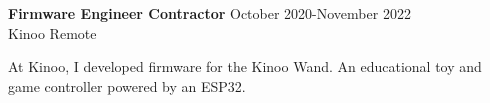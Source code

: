 \textbf{Firmware Engineer Contractor} \hfill October 2020-November 2022 \\
Kinoo \hfill Remote
\begin{description} \itemsep -2pt %
\item At Kinoo, I developed firmware for the Kinoo Wand. An educational toy and
game controller powered by an ESP32. 
\end{description}
